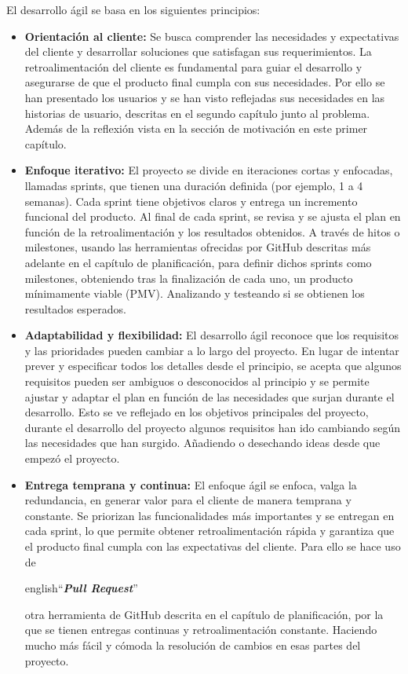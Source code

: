 El desarrollo ágil se basa en los siguientes principios:

\begin{itemize}
\item \textbf{Orientación al cliente:} Se busca comprender las necesidades y expectativas del cliente y 
desarrollar soluciones que satisfagan sus requerimientos. La retroalimentación del cliente es 
fundamental para guiar el desarrollo y asegurarse de que el producto final cumpla con sus necesidades.
Por ello se han presentado los usuarios y se han visto reflejadas sus necesidades en las historias de 
usuario, descritas en el segundo capítulo junto al problema. Además de la reflexión vista en la sección 
de motivación en este primer capítulo.

\item \textbf{Enfoque iterativo:} El proyecto se divide en iteraciones cortas y enfocadas, llamadas 
sprints, que tienen una duración definida (por ejemplo, 1 a 4 semanas). Cada sprint tiene objetivos 
claros y entrega un incremento funcional del producto. Al final de cada sprint, se revisa y se ajusta 
el plan en función de la retroalimentación y los resultados obtenidos.
A través de hitos o milestones, usando las herramientas ofrecidas por GitHub descritas más adelante en 
el capítulo de planificación, para definir dichos sprints como milestones, obteniendo tras la 
finalización de cada uno, un producto mínimamente viable (PMV). Analizando y testeando si se obtienen 
los resultados esperados.

\item \textbf{Adaptabilidad y flexibilidad:} El desarrollo ágil reconoce que los requisitos y las 
prioridades pueden cambiar a lo largo del proyecto. En lugar de intentar prever y especificar todos los 
detalles desde el principio, se acepta que algunos requisitos pueden ser ambiguos o desconocidos al 
principio y se permite ajustar y adaptar el plan en función de las necesidades que surjan durante el 
desarrollo.
Esto se ve reflejado en los objetivos principales del proyecto, durante el desarrollo del proyecto 
algunos requisitos han ido cambiando según las necesidades que han surgido. Añadiendo o desechando 
ideas desde que empezó el proyecto.

\item \textbf{Entrega temprana y continua:} El enfoque ágil se enfoca, valga la redundancia, en generar valor para el 
cliente de manera temprana y constante. Se priorizan las funcionalidades más importantes y se entregan en cada 
sprint, lo que permite obtener retroalimentación rápida y garantiza que el producto final cumpla con 
las expectativas del cliente. Para ello se hace uso de \begin{otherlanguage} 
{english}``\textit{\textbf{Pull Request}}''\end{otherlanguage} otra herramienta de GitHub descrita en 
el capítulo de planificación, por la que se tienen entregas continuas y retroalimentación constante. 
Haciendo mucho más fácil y cómoda la resolución de cambios en esas partes del proyecto.

\end{itemize}

